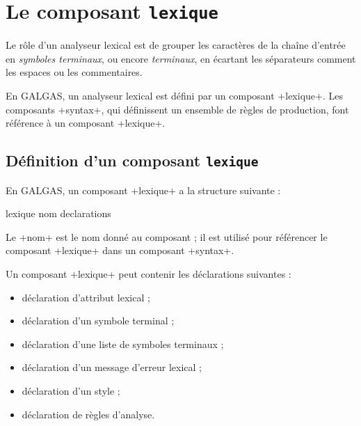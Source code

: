 
\chapter{Le composant \texttt{lexique}}



Le rôle d'un analyseur lexical est de grouper les caractères de la chaîne d'entrée en \emph{symboles terminaux}, ou encore \emph{terminaux}, en écartant les séparateurs comment les espaces ou les commentaires.

En GALGAS, un analyseur lexical est défini par un composant \ggst+lexique+. Les composants \ggst+syntax+, qui définissent un ensemble de règles de production, font référence à un composant \ggst+lexique+.









\section{Définition d'un composant \texttt{lexique}}


En GALGAS, un composant \ggst+lexique+ a la structure suivante :

\begin{galgas3}
lexique nom {
  declarations
}
\end{galgas3}

Le \ggst+nom+ est le nom donné au composant ; il est utilisé pour référencer le composant \ggst+lexique+ dans un composant \ggst+syntax+.


Un composant \ggst+lexique+ peut contenir les déclarations suivantes :
\begin{itemize}
  \item déclaration d'attribut lexical ;
  \item déclaration d'un symbole terminal ;
  \item déclaration d'une liste de symboles terminaux ;
  \item déclaration d'un message d'erreur lexical ;
  \item déclaration d'un style ;
  \item déclaration de règles d'analyse.
\end{itemize}

